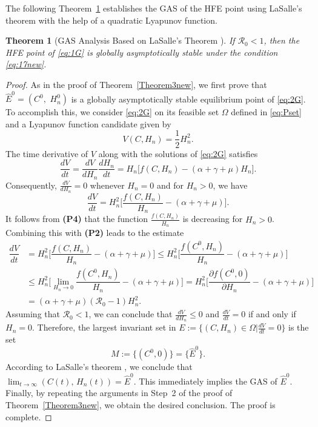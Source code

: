 \documentclass[11pt]{article}
\newtheorem{theorem}{Theorem}[section]
\theoremstyle{definition}
\theoremstyle{remark}
\numberwithin{equation}{section}
\begin{document}
The following Theorem~\ref{Theorem3} establishes the GAS of the HFE point using LaSalle's theorem \cite[Theorem 4.4]{Khalil} with the help of a quadratic Lyapunov function.
\begin{theorem}[GAS Analysis Based on LaSalle's Theorem ]\label{Theorem3}
If $\mathcal{R}_0 < 1$, then the HFE point of \eqref{eq:1G} is globally asymptotically stable under the condition \eqref{eq:17new}.
\end{theorem}
\begin{proof}
As in the proof of Theorem~\ref{Theorem3new}, we first prove that $\widehat{E}^0 = (C^0,\,\,H_n^0)$ is a globally asymptotically stable equilibrium point of \eqref{eq:2G}.
To accomplish this, we consider \eqref{eq:2G} on its feasible set $\Omega$ defined in \eqref{eq:Pset} and a Lyapunov function candidate given by
\begin{equation}\label{eq:L1}
V(C, H_n) = \dfrac{1}{2}H_n^2.
\end{equation}
The time derivative of $V$ along with the solutions of \eqref{eq:2G} satisfies
\begin{equation*}
    \dfrac{dV}{dt} = \dfrac{dV}{dH_n}\dfrac{dH_n}{dt} = H_n\big[f(C, H_n) - (\alpha + \gamma + \mu)H_n\big].
\end{equation*}
Consequently, $\frac{dV}{dH_n} = 0$ whenever $H_n = 0$ and for $H_n > 0$, we have
\begin{equation*}
     \dfrac{dV}{dt} = H_n^2\bigg[\dfrac{f(C, H_n)}{H_n} - (\alpha + \gamma + \mu)\bigg].
\end{equation*}
It follows from \textbf{(P4)} that the function $\frac{f(C, H_n)}{H_n}$ is decreasing for $H_n > 0$. 
Combining this with \textbf{(P2)} leads to the estimate
\begin{equation*}
\begin{split}  
   \dfrac{dV}{dt} &= H_n^2\bigg[\dfrac{f(C, H_n)}{H_n} - (\alpha + \gamma + \mu)\bigg] \le H_n^2\bigg[\dfrac{f(C^0, H_n)}{H_n} - (\alpha + \gamma + \mu)\bigg]\\
   &\le H_n^2\bigg[\lim_{H_n \to 0}\dfrac{f(C^0, H_n)}{H_n} - (\alpha + \gamma + \mu)\bigg] = H_n^2\bigg[\dfrac{\partial f(C^0, 0)}{\partial H_n} - (\alpha + \gamma + \mu)\bigg]\\
   &=  (\alpha + \gamma + \mu)(\mathcal{R}_0 - 1)H_n^2.
\end{split}
\end{equation*}
Assuming that $\mathcal{R}_0 < 1$, we can conclude that $\frac{dV}{dH_n} \le 0$ and $\frac{dV}{dt} = 0$ if and only if $H_n = 0$. 
Therefore, the largest invariant set in $E := \Big\{(C, H_n) \in \Omega|\frac{dV}{dt} = 0\Big\}$ is the set
\begin{equation*}
M := \{(C^0, 0)\} = \{\widehat{E}^0\}.
\end{equation*}
According to LaSalle's theorem \cite[Theorem 4.4]{Khalil}, we conclude that $\lim_{t \to \infty}(C(t),\,H_n(t)) = \widehat{E}^0$. 
This immediately implies the GAS of $\widehat{E}^0$.
%
Finally, by repeating the arguments in Step~2 of the proof of Theorem~\ref{Theorem3new}, we obtain the desired conclusion. The proof is complete.
\end{proof}
\end{document}
